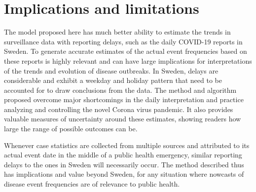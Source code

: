\documentclass[a4paper,11pt,article,oneside,openany,american]{memoir}
\begin{document}




\chapter{Implications and limitations}
The model proposed here has much better ability to estimate the trends in surveillance data with reporting delays, such as the daily COVID-19 reports in Sweden. To generate accurate estimates of the actual event frequencies based on these reports is highly relevant and can have large implications for interpretations of the trends and evolution of disease outbreaks. In Sweden, delays are considerable and exhibit a weekday and holiday pattern that need to be accounted for to draw conclusions from the data. The method and algorithm proposed overcome major shortcomings in the daily interpretation and practice analyzing and controlling the novel Corona virus pandemic. It also provides valuable measures of uncertainty around these estimates, showing readers how large the range of possible outcomes can be.

Whenever case statistics are collected from multiple sources and attributed to its actual event date in the middle of a public health emergency, similar reporting delays to the ones in Sweden will necessarily occur. The method described thus has implications and value beyond Sweden, for any situation where nowcasts of disease event frequencies are of relevance to public health.
\end{document}
